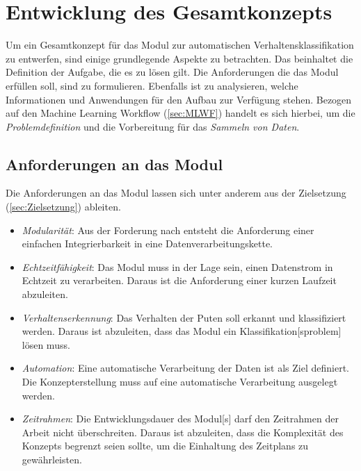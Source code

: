 \section{Entwicklung des Gesamtkonzepts} \label{sec:Meth gesamtkonzept}
Um ein Gesamtkonzept für das \gls{Modul} zur automatischen Verhaltensklassifikation zu entwerfen, sind einige grundlegende Aspekte zu betrachten. Das beinhaltet die Definition der Aufgabe, die es zu lösen gilt. Die Anforderungen die das \gls{Modul} erfüllen soll, sind zu formulieren. Ebenfalls ist zu analysieren, welche Informationen und Anwendungen für den Aufbau zur Verfügung stehen. Bezogen auf den \gls{Machine Learning Workflow} (\ref{sec:MLWF}) handelt es sich hierbei, um die \textit{Problemdefinition} und die Vorbereitung für das \textit{Sammeln von Daten}. \par

\subsection{Anforderungen an das Modul} \label{sec:Meth Anforderungen}

Die Anforderungen an das \gls{Modul} lassen sich unter anderem aus der Zielsetzung (\ref{sec:Zielsetzung}) ableiten. 

\begin{itemize}
    \item \textit{Modularität}: Aus der Forderung nach  entsteht die Anforderung einer einfachen Integrierbarkeit in eine Datenverarbeitungskette.
    \item \textit{Echtzeitfähigkeit}: Das \gls{Modul} muss in der Lage sein, einen Datenstrom in Echtzeit zu verarbeiten. Daraus ist die Anforderung einer kurzen Laufzeit abzuleiten.
    \item \textit{Verhaltenserkennung}: Das Verhalten der Puten soll erkannt und klassifiziert werden. Daraus ist abzuleiten, dass das \gls{Modul} ein \gls{Klassifikation}[sproblem] lösen muss.
    \item \textit{Automation}: Eine automatische Verarbeitung der Daten ist als Ziel definiert. Die Konzepterstellung muss auf eine automatische Verarbeitung ausgelegt werden. 
    \item \textit{Zeitrahmen}: Die Entwicklungsdauer des \gls{Modul}[s] darf den Zeitrahmen der Arbeit nicht überschreiten. Daraus ist abzuleiten, dass die Komplexität des Konzepts begrenzt seien sollte, um die Einhaltung des Zeitplans zu gewährleisten.
\end{itemize}


